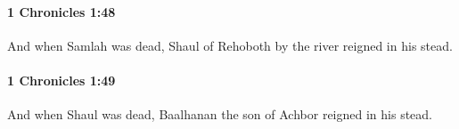 		\paragraph{1 Chronicles 1:48} %
			\label{1CHRONICLES-1-48}

			And when Samlah was dead, Shaul of Rehoboth by the river reigned in his stead.


		\paragraph{1 Chronicles 1:49} %
			\label{1CHRONICLES-1-49}

			And when Shaul was dead, Baalhanan the son of Achbor reigned in his stead.


